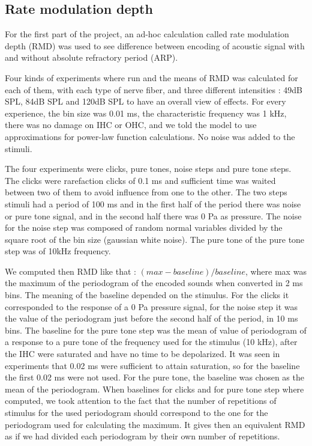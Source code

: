 
\subsection{Rate modulation depth}

For the first part of the project, an ad-hoc calculation called rate 
modulation depth (RMD) was used to see difference between encoding 
of acoustic signal with and without absolute refractory period (ARP).

Four kinds of experiments where run and the means of RMD was calculated 
for each of them, 
with each type of nerve fiber, and three different intensities : 
49dB SPL, 84dB SPL and 120dB SPL to have an overall view of effects. 
For every experience, the bin size was 0.01 ms, the characteristic frequency was 1 kHz, 
there was no damage on IHC or OHC, and we told the model to use approximations 
for power-law function calculations. No noise was added to the stimuli.

The four experiments were clicks, pure tones, noise steps and pure tone steps.
The clicks were rarefaction clicks of 0.1 ms and sufficient time was waited between 
two of them to avoid influence from one to the other.
The two steps stimuli had a period of 100 ms and in the first half of the period 
there was noise or pure tone signal, and in the second half there was 0 Pa as pressure.
The noise for the noise step was composed of random normal variables divided 
by the square root of the bin size (gaussian white noise).
The pure tone of the pure tone step was of 10kHz frequency.

We computed then RMD like that : $(max - baseline) / baseline$, where max was 
the maximum of the periodogram of the encoded sounds when converted in 2 ms bins.
The meaning of the baseline depended on the stimulus. 
For the clicks it corresponded to the response of a 0 Pa pressure signal, 
for the noise step it was the value of the periodogram just before the second 
half of the period, in 10 ms bins. 
The baseline for the pure tone step was the mean of value of periodogram 
of a response to a pure tone of the frequency used for the stimulus (10 kHz),
after the IHC were saturated and have no time to be depolarized. 
It was seen in experiments that 0.02 ms were sufficient to attain saturation,
so for the baseline the first 0.02 ms were not used.
For the pure tone, the baseline was chosen as the mean of the periodogram.
When baselines for clicks and for pure tone step where computed, 
we took attention to the fact that the number of repetitions of stimulus
for the used periodogram should correspond to the one for the periodogram used for 
calculating the maximum. 
It gives then an equivalent RMD as if we had divided each periodogram by 
their own number of repetitions.

